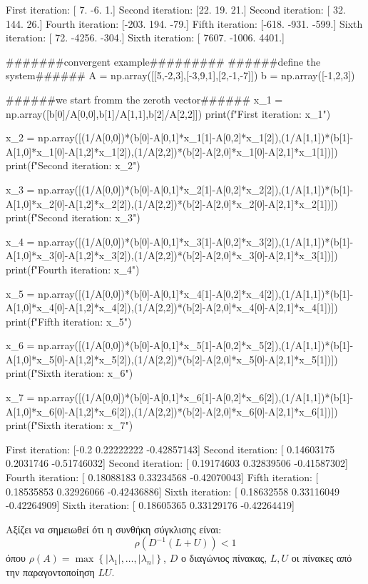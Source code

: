 \vspace*{-0.7cm}
\begin{codeout}
First iteration: [ 7. -6.  1.]
Second iteration: [22. 19. 21.]
Second iteration: [ 32. 144.  26.]
Fourth iteration: [-203.  194.  -79.]
Fifth iteration: [-618. -931. -599.]
Sixth iteration: [   72. -4256.  -304.]
Sixth iteration: [ 7607. -1006.  4401.]
\end{codeout}
\begin{python}
#######convergent example#########
######define the system######
A = np.array([[5,-2,3],[-3,9,1],[2,-1,-7]])
b = np.array([-1,2,3])

######we start fromm the zeroth vector######
x_1 = np.array([b[0]/A[0,0],b[1]/A[1,1],b[2]/A[2,2]])
print(f"First iteration: {x_1}")

x_2 = np.array([(1/A[0,0])*(b[0]-A[0,1]*x_1[1]-A[0,2]*x_1[2]),(1/A[1,1])*(b[1]-A[1,0]*x_1[0]-A[1,2]*x_1[2]),(1/A[2,2])*(b[2]-A[2,0]*x_1[0]-A[2,1]*x_1[1])])
print(f"Second iteration: {x_2}")

x_3 = np.array([(1/A[0,0])*(b[0]-A[0,1]*x_2[1]-A[0,2]*x_2[2]),(1/A[1,1])*(b[1]-A[1,0]*x_2[0]-A[1,2]*x_2[2]),(1/A[2,2])*(b[2]-A[2,0]*x_2[0]-A[2,1]*x_2[1])])
print(f"Second iteration: {x_3}")

x_4 = np.array([(1/A[0,0])*(b[0]-A[0,1]*x_3[1]-A[0,2]*x_3[2]),(1/A[1,1])*(b[1]-A[1,0]*x_3[0]-A[1,2]*x_3[2]),(1/A[2,2])*(b[2]-A[2,0]*x_3[0]-A[2,1]*x_3[1])])
print(f"Fourth iteration: {x_4}")

x_5 = np.array([(1/A[0,0])*(b[0]-A[0,1]*x_4[1]-A[0,2]*x_4[2]),(1/A[1,1])*(b[1]-A[1,0]*x_4[0]-A[1,2]*x_4[2]),(1/A[2,2])*(b[2]-A[2,0]*x_4[0]-A[2,1]*x_4[1])])
print(f"Fifth iteration: {x_5}")

x_6 = np.array([(1/A[0,0])*(b[0]-A[0,1]*x_5[1]-A[0,2]*x_5[2]),(1/A[1,1])*(b[1]-A[1,0]*x_5[0]-A[1,2]*x_5[2]),(1/A[2,2])*(b[2]-A[2,0]*x_5[0]-A[2,1]*x_5[1])])
print(f"Sixth iteration: {x_6}")

x_7 = np.array([(1/A[0,0])*(b[0]-A[0,1]*x_6[1]-A[0,2]*x_6[2]),(1/A[1,1])*(b[1]-A[1,0]*x_6[0]-A[1,2]*x_6[2]),(1/A[2,2])*(b[2]-A[2,0]*x_6[0]-A[2,1]*x_6[1])])
print(f"Sixth iteration: {x_7}")
\end{python}
\vspace*{-0.7cm}
\begin{codeout}
First iteration: [-0.2         0.22222222 -0.42857143]
Second iteration: [ 0.14603175  0.2031746  -0.51746032]
Second iteration: [ 0.19174603  0.32839506 -0.41587302]
Fourth iteration: [ 0.18088183  0.33234568 -0.42070043]
Fifth iteration: [ 0.18535853  0.32926066 -0.42436886]
Sixth iteration: [ 0.18632558  0.33116049 -0.42264909]
Sixth iteration: [ 0.18605365  0.33129176 -0.42264419]
\end{codeout}
\gr

Αξίζει να σημειωθεί ότι η συνθήκη σύγκλισης είναι:
\begin{equation}
\rho\left(D^{-1}(L+U)\right)<1
\end{equation}
όπου $\rho(A)=\max \left\{\left|\lambda_1\right|, \ldots,\left|\lambda_n\right|\right\}$, $D$ ο διαγώνιος πίνακας, $L,U$ οι πίνακες από την παραγοντοποίηση $LU$. 
